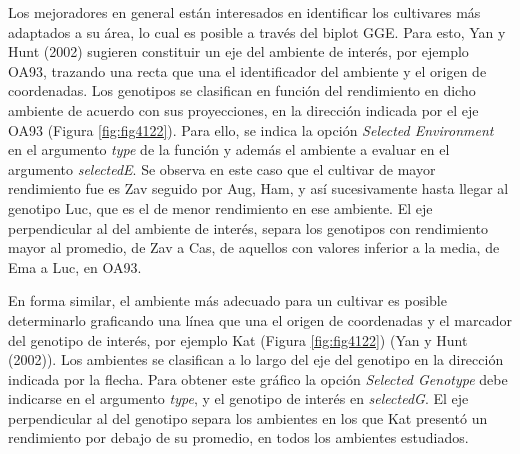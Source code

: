 Los mejoradores en general están interesados en identificar los cultivares más adaptados a su área, lo cual es posible a través del biplot GGE. Para esto, Yan y Hunt (2002) sugieren constituir un eje del ambiente de interés, por ejemplo OA93, trazando una recta que una el identificador del ambiente y el origen de coordenadas. Los genotipos se  clasifican en función del rendimiento en dicho ambiente de acuerdo con sus proyecciones, en la dirección indicada por el eje OA93 (Figura \ref{fig:fig4122}). Para ello, se indica la opción \emph{Selected Environment} en el argumento \emph{type} de la función y además el ambiente a evaluar en el argumento  \emph{selectedE}. Se observa en este caso que el cultivar de mayor rendimiento fue es Zav seguido por Aug, Ham, y así sucesivamente hasta llegar al genotipo Luc, que es el de menor rendimiento en ese ambiente. El eje perpendicular al del ambiente de interés, separa los genotipos con rendimiento mayor al promedio, de Zav a Cas, de aquellos con valores inferior a la media, de Ema a Luc, en OA93.
 
En forma similar, el ambiente más adecuado para un cultivar es posible determinarlo graficando una línea que una el origen de coordenadas y el marcador del genotipo de interés, por ejemplo Kat (Figura \ref{fig:fig4122}) (Yan y Hunt (2002)). Los ambientes se clasifican a lo largo del eje del genotipo en la dirección indicada por la flecha. Para obtener este gráfico la opción  \emph{Selected Genotype} debe indicarse en el argumento \emph{type}, y el genotipo de interés en  \emph{selectedG}. El eje perpendicular al del genotipo separa los ambientes en los que Kat presentó un rendimiento por debajo de su promedio, en todos los ambientes estudiados.

